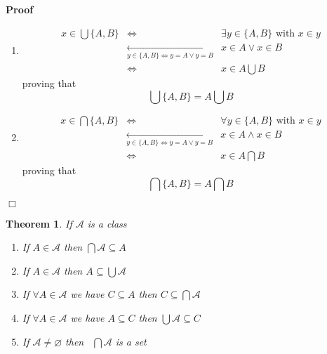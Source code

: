 \documentclass{book}
\newcommand{\Leftrightarrowlim}{\mathop{\leftrightarrow}\limits}
\newenvironment{proof}{\noindent\textbf{Proof\ }}{\hspace*{\fill}$\Box$\medskip}
\newtheorem{theorem}{Theorem}
\begin{document}
\begin{proof}
  
  \begin{enumerate}
    \item 
    \begin{eqnarray*}
      x \in \bigcup \{ A, B \} & \Leftrightarrow & \exists y \in \{ A, B \}
      \text{ with } x \in y\\
      & \Leftrightarrowlim_{y \in \{ A, B \} \Leftrightarrow y = A \vee y =
      B} & x \in A \vee x \in B\\
      & \Leftrightarrow & x \in A \bigcup B
    \end{eqnarray*}
    proving that
    \[ \bigcup \{ A, B \} = A \bigcup B \]
    \item 
    \begin{eqnarray*}
      x \in \bigcap \{ A, B \} & \Leftrightarrow & \forall y \in \{ A, B \}
      \text{ with } x \in y\\
      & \Leftrightarrowlim_{y \in \{ A, B \} \Leftrightarrow y = A \vee y =
      B} & x \in A \wedge x \in B\\
      & \Leftrightarrow & x \in A \bigcap B
    \end{eqnarray*}
    proving that
    \[ \bigcap \{ A, B \} = A \bigcap B \]
  \end{enumerate}
  
\end{proof}

\begin{theorem}
  \label{class general intersection}If $\mathcal{A}$ is a class
  \begin{enumerate}
    \item If $A \in \mathcal{A}$ then $\bigcap \mathcal{A} \subseteq A$
    
    \item If $A \in \mathcal{A}$ then $A \subseteq \bigcup \mathcal{A}$
    
    \item If $\forall A \in \mathcal{A}$ we have $C \subseteq A$ then $C
    \subseteq \bigcap \mathcal{A}$
    
    \item If $\forall A \in \mathcal{A}$ we have $A \subseteq C$ then $\bigcup
    \mathcal{A} \subseteq C$
    
    \item If $\mathcal{A} \neq \varnothing$ then \ $\bigcap \mathcal{A}$ is a
    set
  \end{enumerate}
\end{theorem}
\end{document}
